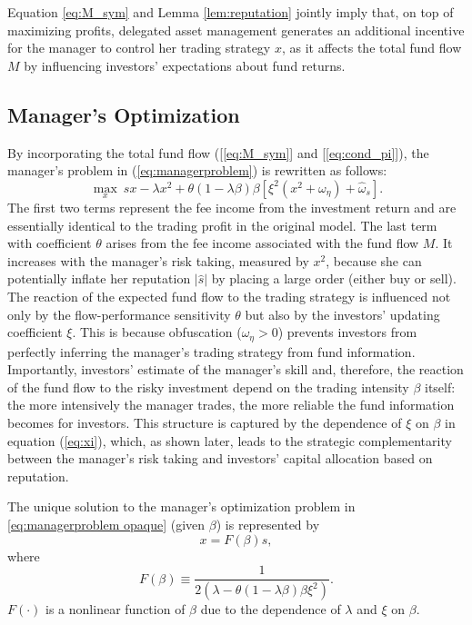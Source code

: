  Equation \eqref{eq:M_sym} and Lemma \ref{lem:reputation} jointly imply that, on top of maximizing profits, delegated asset management generates an additional incentive for the manager to control her trading strategy $x$, as it affects the total fund flow $M$ by influencing investors' expectations about fund returns.

\subsection{Manager's Optimization} \label{ss:optimization_opaque}
By incorporating the total fund flow ([\ref{eq:M_sym}] and [\ref{eq:cond_pi}]), the manager's problem in (\ref{eq:managerproblem}) is rewritten as follows:
\begin{equation}
	\max_{x}\ sx - \lambda x^2 + \theta(1-\lambda\beta)\beta \left[\xi^2(x^2 + \omega_{\eta})+\hat{\omega}_{s}\right].\label{eq:managerproblem opaque}
\end{equation}
The first two terms represent the fee income from the investment return and are essentially identical to the trading profit in the original \citet{kyle1985continuous} model. The last term with coefficient $\theta$ arises from the fee income associated with the fund flow $M$. It increases with the manager's risk taking, measured by $x^2$, because she can potentially inflate her reputation $|\hat{s}|$ by placing a large order (either buy or sell). The reaction of the expected fund flow to the trading strategy is influenced not only by the flow-performance sensitivity $\theta$ but also by the investors' updating coefficient $\xi$. This is because obfuscation ($\omega_{\eta}>0$) prevents investors from perfectly inferring the manager's trading strategy from fund information. Importantly, investors' estimate of the manager's skill and, therefore, the reaction of the fund flow to the risky investment depend on the trading intensity $\beta$ itself: the more intensively the manager trades, the more reliable the fund information becomes for investors. This structure is captured by the dependence of $\xi$ on $\beta$ in equation (\ref{eq:xi}), which, as shown later, leads to the strategic complementarity between the manager's risk taking and investors' capital allocation based on reputation.

The unique solution to the manager's optimization problem in \eqref{eq:managerproblem opaque} (given $\beta$) is represented by
\begin{equation}
x=F(\beta)s,\label{x}
\end{equation}
where
\begin{equation}
F(\beta)\equiv\frac{1}{2\left(\lambda-\theta(1-\lambda\beta)\beta\xi^{2}\right)}.\label{F}
\end{equation}
$F(\cdot)$ is a nonlinear function of $\beta$ due to the dependence of $\lambda$ and $\xi$ on $\beta$. 

